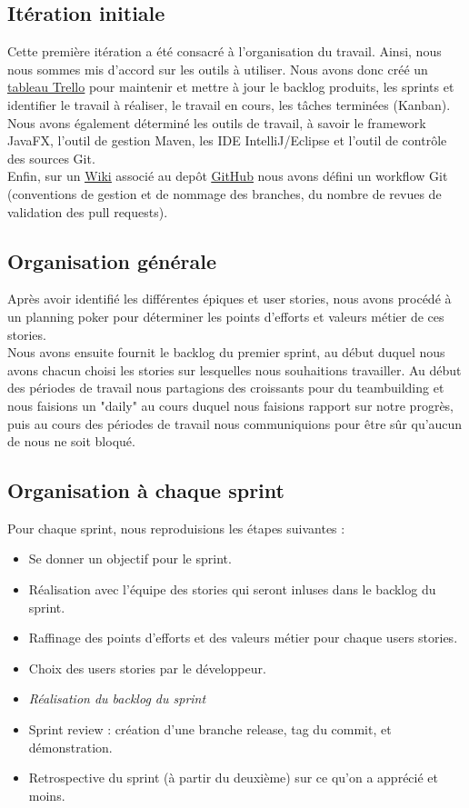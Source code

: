 \documentclass[10pt,a4paper]{article}
\begin{document}
\subsection{Itération initiale}
Cette première itération a été consacré à l'organisation du travail. Ainsi, nous nous sommes mis d'accord sur les outils à utiliser. Nous avons donc créé un \href{https://trello.com/b/HyinoLEE/navigateur}{\underline{tableau Trello}} pour maintenir et mettre à jour le backlog  produits, les sprints et identifier le travail à réaliser, le travail en cours, les tâches terminées (Kanban). \\ 
Nous avons également déterminé les outils de travail, à savoir le framework JavaFX, l'outil de gestion Maven, les IDE IntelliJ/Eclipse et l'outil de contrôle des sources Git. \\ 
Enfin, sur un \href{https://github.com/simjnd/navigateur/wiki}{\underline{Wiki}} associé au depôt \href{https://github.com/simjnd/navigateur}{\underline{GitHub}} nous avons défini un workflow Git (conventions de gestion et de nommage des branches, du nombre de revues de validation des pull requests).

\subsection{Organisation générale}

Après avoir identifié les différentes épiques et user stories, nous avons procédé à un planning poker pour déterminer les points d'efforts et valeurs métier de ces stories. \\
Nous avons ensuite fournit le backlog du premier sprint, au début duquel nous avons chacun choisi les stories sur lesquelles nous souhaitions travailler. Au début des périodes de travail nous partagions des croissants pour du teambuilding et nous faisions un "daily" au cours duquel nous faisions rapport sur notre progrès, puis au cours des périodes de travail nous communiquions pour être sûr qu'aucun de nous ne soit bloqué.

\subsection{Organisation à chaque sprint}
Pour chaque sprint, nous reproduisions les étapes suivantes :
\begin{itemize}
\item Se donner un objectif pour le sprint.
\item Réalisation avec l'équipe des stories qui seront inluses dans le backlog du sprint.
\item Raffinage des points d'efforts et des valeurs métier pour chaque users stories.
\item Choix des users stories par le développeur.
\item \textit{Réalisation du backlog du sprint}
\item Sprint review : création d'une branche release, tag du commit, et démonstration.
\item Retrospective du sprint (à partir du deuxième) sur ce qu'on a apprécié et moins.
\end{itemize}
\end{document}
